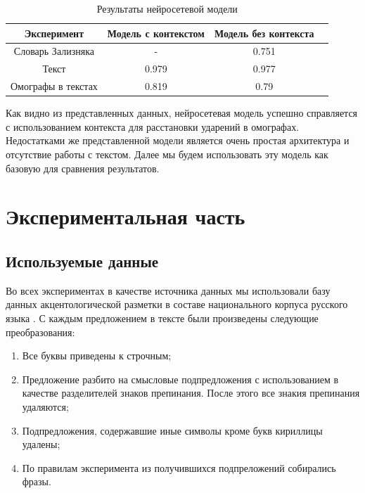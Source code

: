\documentclass[14pt, a4paper, russian]{extreport}
\begin{document}
\begin{table}[H]
		\caption{Результаты нейросетевой модели}
	
	\begin{small}
		\begin{center}
			\begin{tabular}{|c|c|c|c|}
				\hline
				   Эксперимент     & Модель с контекстом & Модель без контекста &  \\ \hline
				Словарь Зализняка  &          -          &        0.751         &  \\ \hline
				      Текст        &        0.979        &        0.977         &  \\ \hline
				Омографы в текстах &        0.819        &         0.79         &  \\ \hline
			\end{tabular}
		\end{center}
	\end{small}
	\label{table:base_text}
\end{table}

Как видно из представленных данных, нейросетевая модель успешно справляется с использованием контекста для расстановки ударений в омографах. Недостатками же представленной модели является очень простая архитектура и отсутствие работы с текстом. Далее мы будем использовать эту модель как базовую для сравнения результатов. 


\newpage
\chapter{Экспериментальная часть}
\section{Используемые данные}
\label{prepare}

Во всех экспериментах в качестве источника данных мы использовали базу данных акцентологической разметки в составе национального корпуса русского языка \cite{grishina}. С каждым предложением в тексте были произведены следующие преобразования:
\begin{enumerate}[  1{)} ]
	\item Все буквы приведены к строчным;
	\item Предложение разбито на смысловые подпредложения с использованием  в качестве разделителей знаков препинания. После этого все знакия препинания удаляются;
	\item Подпредложения, содержавшие  иные символы кроме букв  кириллицы удалены;
	\item По правилам эксперимента из получившихся подпреложений собирались фразы.
\end{enumerate}
\end{document}
